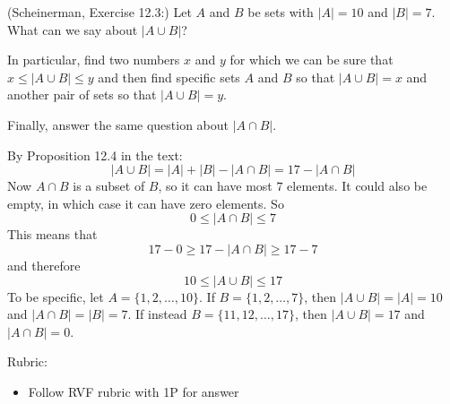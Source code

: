 \documentclass{article}
\theoremstyle{definition}
\begin{document}
\begin{question}
    (Scheinerman, Exercise 12.3:)
    Let $A$ and $B$ be sets with $|A| = 10$ and $|B| = 7$.
    What can we say about $|A\cup B|$?
    
    In particular, find two numbers $x$ and $y$ for which we can be sure that $x \leq |A \cup B| \leq y$ and then find specific sets $A$ and $B$ so that $|A \cup B| = x$ and another pair of sets so that $|A \cup B| = y$.
    
    Finally, answer the same question about $|A\cap B|$.  
\end{question}
\begin{solution}
    By Proposition 12.4 in the text:
    \[
        |A\cup B| = |A| + |B| - | A \cap B| = 17 - |A \cap B|
    \]
    Now $A \cap B$ is a subset of $B$, so it can have most $7$ elements.
    It could also be empty, in which case it can have zero elements.
    So
    \[
        0 \leq |A \cap B| \leq 7
    \]
    This means that 
    \[
       17-0 \geq 17 - |A \cap B| \geq 17-7
    \]
    and therefore 
    \[
        10 \leq |A \cup B| \leq 17
    \]
    To be specific, let $A = \{1,2,\dots,10\}$.
    If $B = \{1,2,\dots,7\}$, then $|A \cup B| = |A| =10$ and $|A \cap B| = |B| = 7$.
    If instead $B = \{11,12,\dots,17\}$, then $|A \cup B| = 17$ and $|A \cap B| = 0$.

{\color{red} Rubric:
\begin{itemize}
\item Follow RVF rubric with 1P for answer
\end{itemize}}
\end{solution}
\end{document}
